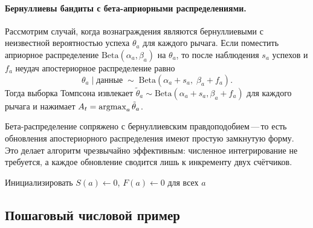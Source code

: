 \paragraph{Бернуллиевы бандиты с бета-априорными распределениями.}
Рассмотрим случай, когда вознаграждения являются бернуллиевыми с неизвестной вероятностью успеха $\theta_a$ для каждого рычага.  Если поместить априорное распределение $\text{Beta}(\alpha_a, \beta_a)$ на $\theta_a$, то после наблюдения $s_a$ успехов и $f_a$ неудач апостериорное распределение равно
\[
\theta_a \mid \mbox{данные} \;\sim\; \text{Beta}(\alpha_a + s_a,\;\beta_a + f_a).
\]
Тогда выборка Томпсона извлекает $\tilde\theta_a\sim\text{Beta}(\alpha_a+s_a,\beta_a+f_a)$ для каждого рычага и нажимает $A_t=\operatorname*{argmax}_a\tilde\theta_a$.

Бета-распределение сопряжено с бернуллиевским правдоподобием\,---\,то есть обновления апостериорного распределения имеют простую замкнутую форму.  Это делает алгоритм чрезвычайно эффективным: численное интегрирование не требуется, а каждое обновление сводится лишь к инкременту двух счётчиков.

\begin{algorithm}[ht]
\caption{Выборка Томпсона для бернуллиевских бандитов}
\label{alg:thompson}
Инициализировать $S(a)\leftarrow 0$, $F(a)\leftarrow 0$ для всех $a$\;
\end{algorithm}

\subsection*{Пошаговый числовой пример}

